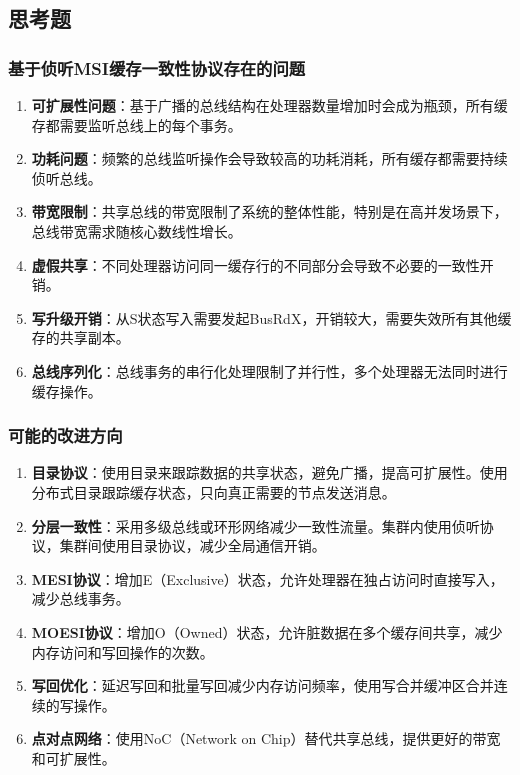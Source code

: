 \documentclass[a4paper]{article}
\begin{document}
\subsection{思考题}

\subsubsection{基于侦听MSI缓存一致性协议存在的问题}

\begin{enumerate}
    \item \textbf{可扩展性问题}：基于广播的总线结构在处理器数量增加时会成为瓶颈，所有缓存都需要监听总线上的每个事务。
    
    \item \textbf{功耗问题}：频繁的总线监听操作会导致较高的功耗消耗，所有缓存都需要持续侦听总线。
    
    \item \textbf{带宽限制}：共享总线的带宽限制了系统的整体性能，特别是在高并发场景下，总线带宽需求随核心数线性增长。
    
    \item \textbf{虚假共享}：不同处理器访问同一缓存行的不同部分会导致不必要的一致性开销。
    
    \item \textbf{写升级开销}：从S状态写入需要发起BusRdX，开销较大，需要失效所有其他缓存的共享副本。
    
    \item \textbf{总线序列化}：总线事务的串行化处理限制了并行性，多个处理器无法同时进行缓存操作。
\end{enumerate}

\subsubsection{可能的改进方向}

\begin{enumerate}
    \item \textbf{目录协议}：使用目录来跟踪数据的共享状态，避免广播，提高可扩展性。使用分布式目录跟踪缓存状态，只向真正需要的节点发送消息。
    
    \item \textbf{分层一致性}：采用多级总线或环形网络减少一致性流量。集群内使用侦听协议，集群间使用目录协议，减少全局通信开销。
    
    \item \textbf{MESI协议}：增加E（Exclusive）状态，允许处理器在独占访问时直接写入，减少总线事务。
    
    \item \textbf{MOESI协议}：增加O（Owned）状态，允许脏数据在多个缓存间共享，减少内存访问和写回操作的次数。
    
    \item \textbf{写回优化}：延迟写回和批量写回减少内存访问频率，使用写合并缓冲区合并连续的写操作。
    
    \item \textbf{点对点网络}：使用NoC（Network on Chip）替代共享总线，提供更好的带宽和可扩展性。
\end{enumerate}
\end{document}
